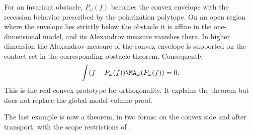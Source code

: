 \begin{example}
For an invariant obstacle, \(P_\omega(f)\) becomes the convex envelope with
the recession behavior prescribed by the polarization polytope. On an open
region where the envelope lies strictly below the obstacle it is affine in
the one-dimensional model, and its Alexandrov measure vanishes there. In
higher dimension the Alexandrov measure of the convex envelope is supported
on the contact set in the corresponding obstacle theorem. Consequently
\[
       \int(f-P_\omega(f))\MA_\omega(P_\omega(f))=0.
\]
This is the real convex prototype for orthogonality. It explains the theorem
but does not replace the global model-volume proof.
\end{example}

The last example is now a theorem, in two forms:
 on the convex side and
 after transport, with the scope
restrictions of .

